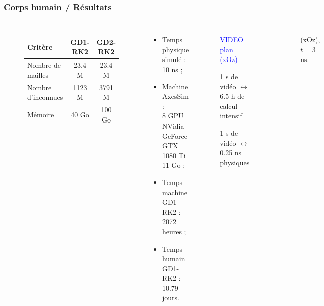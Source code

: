 \begin{frame}
\frametitle{Corps humain / Résultats}
\vfill
\begin{columns}
\begin{figure}
\begin{tabular}{|l|c|c|}
	\hline
	Critère & GD1-RK2 & GD2-RK2 \\ \hline\hline
	Nombre de mailles & 23.4 M & 23.4 M \\	\hline
	Nombre d'inconnues & 1123 M & 3791 M \\	\hline
	Mémoire & 40 Go & 100 Go \\	\hline
\end{tabular}
\end{figure}
\vfill
\begin{itemize}
\item Temps physique simulé : 10 ns ;
\item Machine AxesSim :\\ 8 GPU NVidia GeForce GTX 1080 Ti 11 Go ;
\item Temps machine GD1-RK2 : 2072 heures ;
\item Temps humain GD1-RK2 : 10.79 jours.
\end{itemize}
\vfill
\begin{figure}
\centering
\href{run:../img/modE_xoz_ogv.mp4}{\textcolor{blue}{VIDEO plan (xOz)}}

1 s de vidéo $\leftrightarrow$ 6.5 h de calcul intensif

1 s de vidéo $\leftrightarrow$ 0.25 ns physiques
\end{figure}
\begin{figure}
\centering
(xOz), $t = 3$ ns.


\end{figure}
\end{columns}
\end{frame}
